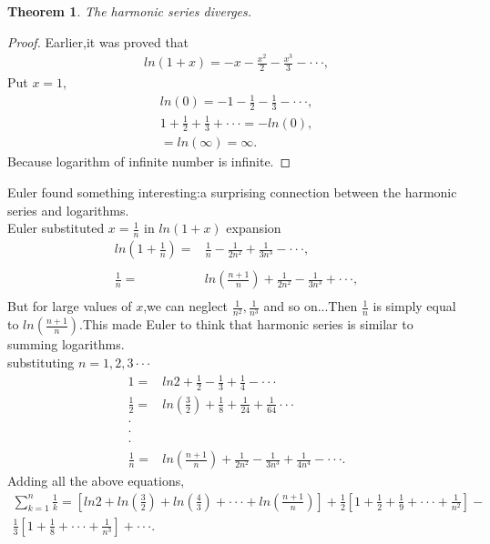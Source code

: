 \documentclass[a4paper,reqno,11pt]{book}
\theoremstyle{plain}%
\newtheorem{thm}{Theorem}[chapter]
\theoremstyle{definition}
\begin{document}
\begin{thm}\label{thm:Type2}
\textit{The harmonic series diverges.}
\end{thm}
\begin{proof} 
Earlier,it was proved that 
\begin{eqnarray*}
    ln(1+x)=-x-\frac{x^2}{2}-\frac{x^3}{3}-\cdot\cdot\cdot,
\end{eqnarray*}
Put $x=1$,
\begin{eqnarray*}
    ln(0)=-1-\frac{1}{2}-\frac{1}{3}-\cdot\cdot\cdot,\\
    1+\frac{1}{2}+\frac{1}{3}+\cdot\cdot\cdot=-ln(0),\\
    =ln(\infty)=\infty.
\end{eqnarray*}
Because logarithm of infinite number is infinite.
\end{proof}
\noindent Euler found something interesting:a surprising connection between the harmonic series and logarithms.\\
Euler substituted $x=\frac{1}{n}$ in $ln(1+x)$ expansion
\begin{align*}
ln\left(1+\frac{1}{n}\right)=&\frac{1}{n}-\frac{1}{2n^2}+\frac{1}{3n^3}-\cdot\cdot\cdot,\\
\\
\frac{1}{n}=&ln\left(\frac{n+1}{n}\right)+\frac{1}{2n^2}-\frac{1}{3n^3}+\cdot\cdot\cdot,\\
\end{align*}
But for large values of $x$,we can neglect $\frac{1}{n^2},\frac{1}{n^3}$ and so on...Then $\frac{1}{n}$ is simply equal to $ln\left(\frac{n+1}{n}\right)$.This made Euler to think that harmonic series is similar to summing logarithms.\\
substituting $n=1,2,3\cdot\cdot\cdot$
\begin{align*}
    1=&ln2+\frac{1}{2}-\frac{1}{3}+\frac{1}{4}-\cdot\cdot\cdot\\
    \frac{1}{2}=&ln\left(\frac{3}{2}\right)+\frac{1}{8}+\frac{1}{24}+\frac{1}{64}\cdot\cdot\cdot\\
    \cdot\\
    \cdot\\
    \cdot\\
\frac{1}{n}=&ln\left(\frac{n+1}{n}\right)+\frac{1}{2n^2}-\frac{1}{3n^3}+\frac{1}{4n^4}-\cdot\cdot\cdot.
\end{align*}
Adding all the above equations,
\begin{eqnarray*}
    \sum_{k=1}^{n}\frac{1}{k}=\left[ln2+ln\left(\frac{3}{2}\right)+ln\left(\frac{4}{3}\right)+\cdot\cdot\cdot+ln\left(\frac{n+1}{n}\right)\right]+\frac{1}{2}\left[1+\frac{1}{2}+\frac{1}{9}+\cdot\cdot\cdot+\frac{1}{n^2}\right]-\\\frac{1}{3}\left[1+\frac{1}{8}+\cdot\cdot\cdot+\frac{1}{n^3}\right]+\cdot\cdot\cdot.
\end{eqnarray*}
\end{document}
